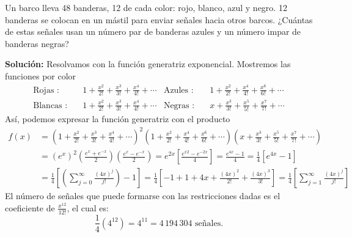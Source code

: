 \begin{myexample}
    Un barco lleva 48 banderas, 12 de cada color: rojo, blanco, azul y negro. 12 banderas se colocan en un mástil para enviar señales hacia otros barcos. ¿Cuántas de estas señales usan un número par de banderas azules y un número impar de banderas negras?

    \tcblower
    \textbf{\color{jblueleft}Solución:} Resolvamos con la función generatriz exponencial. Mostremos las funciones por color
    \begin{align*}
        \text{Rojas :} & \quad 1 + \frac{x^{2}}{2!} + \frac{x^{3}}{3!} + \frac{x^{4}}{4!} + \cdots &  \text{Azules :} & \quad 1 + \frac{x^{2}}{2!} + \frac{x^{4}}{4!} + \frac{x^{6}}{6!} + \cdots \\
        \text{Blancas :} & \quad 1 + \frac{x^{2}}{2!} + \frac{x^{3}}{3!} + \frac{x^{4}}{4!} + \cdots & \text{Negras :} & \quad x + \frac{x^{3}}{3!} + \frac{x^{5}}{5!} + \frac{x^{7}}{7!} + \cdots
    \end{align*}
    Así, podemos expresar la función generatriz con el producto
    \begin{align*}
        f(x) & = \left( 1 + \frac{x^{2}}{2!} + \frac{x^{3}}{3!} + \frac{x^{4}}{4!} + \cdots \right)^{2} \left( 1 + \frac{x^{2}}{2!} + \frac{x^{4}}{4!} + \frac{x^{6}}{6!} + \cdots \right) \left( x + \frac{x^{3}}{3!} + \frac{x^{5}}{5!} + \frac{x^{7}}{7!} + \cdots \right) \\
        & = \left( e^{x} \right)^{2} \left( \frac{e^{x} + e^{-x}}{2} \right) \left( \frac{e^{x} - e^{-x}}{2} \right) = e^{2x} \left[ \frac{e^{x2} - e^{-2x}}{4} \right] = \frac{e^{4x}-1}{4} = \frac{1}{4} \left[ e^{4x} - 1 \right] \\
        & = \frac{1}{4} \left[ \left( \sum_{j=0}^{\infty} \frac{(4x)^{j}}{j!} \right) - 1 \right] = \frac{1}{4} \left[ -1 + 1 + 4x + \frac{(4x)^{2}}{2!} + \frac{(4x)^{3}}{3!} \right] = \frac{1}{4} \left[ \sum_{j=1}^{\infty} \frac{(4x)^{j}}{j!} \right]
    \end{align*}
    El número de señales que puede formarse con las restricciones dadas es el coeficiente de $\displaystyle \frac{x^{12}}{12!}$, el cual es:
    $$\frac{1}{4} \left( 4^{12} \right) = 4^{11} = 4 \, 194 \, 304 \text{ señales.}$$
\end{myexample}

